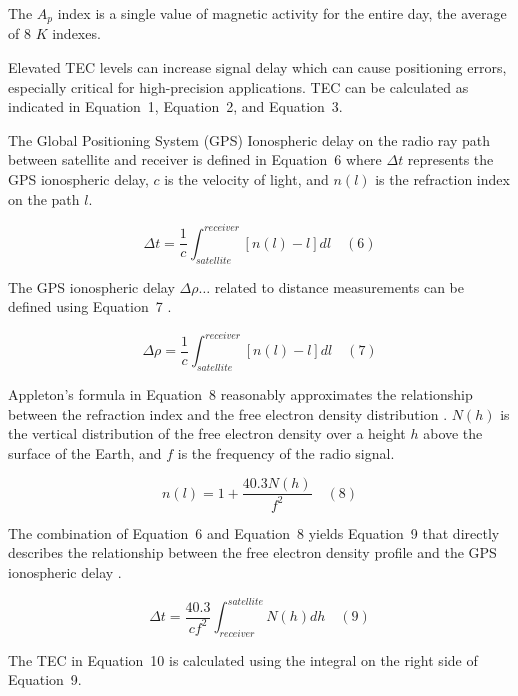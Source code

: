 \documentclass[sn-mathphys-num]{sn-jnl}%
\begin{document}
The $A_p$ index is a single value of magnetic activity for the entire day, the average of $8$ $K$ indexes. 
 
Elevated TEC levels can increase signal delay which can cause positioning errors, especially critical for high-precision applications. TEC can be calculated as indicated in Equation~1, Equation~2, and Equation~3. 

The Global Positioning System (GPS) Ionospheric delay on the radio ray path between satellite and receiver is defined in Equation~6 \cite{spilker1996global} where $\Delta t$ represents the GPS ionospheric delay, $c$ is the velocity of light, and $n(l)$ is the refraction index on the path $l$.

\begin{equation}
	\Delta t = \frac{1}{c} \int_{satellite}^{receiver} \left[ n(l) - l \right]dl
	\quad\left(6\right)
\end{equation}

The GPS ionospheric delay $\Delta \rho \dots$ related to distance measurements can be defined using Equation~7 \cite{spilker1996global}.

\begin{equation}
	\Delta \rho = \frac{1}{c} \int_{satellite}^{receiver} \left[ n(l) - l \right]dl
	\quad\left(7\right)
\end{equation}

Appleton’s formula in Equation~8 reasonably approximates the relationship between the refraction index and the free electron density distribution \cite{davies1990ionospheric, spilker1996global}. $N(h)$ is the vertical distribution of the free electron density over a height $h$ above the surface of the Earth, and $f$ is the frequency of the radio signal.

\begin{equation}
	n(l) = 1 + \frac{40.3 N(h)}{f^{2}}
	\quad\left(8\right)
\end{equation}

The combination of Equation~6 and Equation~8 yields Equation~9 that directly describes the relationship between the free electron density profile and the GPS ionospheric delay \cite{spilker1996global}.

\begin{equation}
	\Delta t = \frac{40.3}{c f^{2}} \int_{receiver}^{satellite} N(h)dh
	\quad\left(9\right)
\end{equation}

The TEC \cite{spilker1996global} in Equation~10 is calculated using the integral on the right side of Equation~9.
\end{document}
